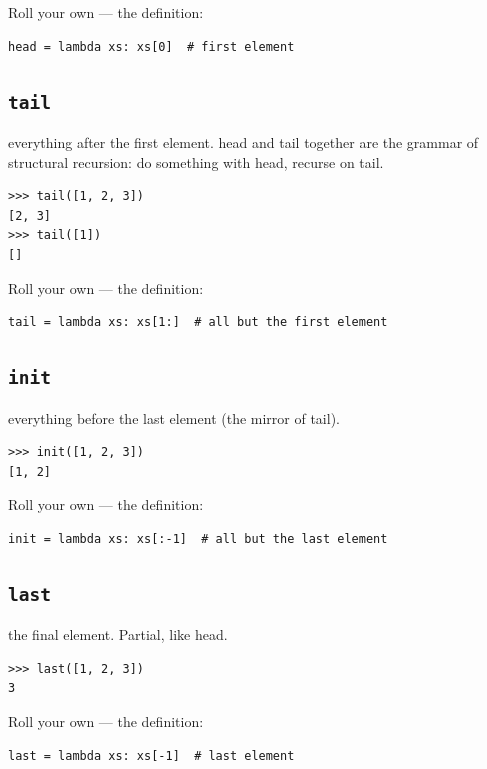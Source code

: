 \documentclass[10pt,letterpaper]{book}
\begin{document}
Roll your own --- the definition:

\begin{lstlisting}[style=ex]
head = lambda xs: xs[0]  # first element
\end{lstlisting}

\subsection{\texttt{tail}}\label{def:tail}
everything after the first element. head and tail together are the grammar of structural recursion: do something with head, recurse on tail.
\begin{lstlisting}[style=ex]
>>> tail([1, 2, 3])
[2, 3]
>>> tail([1])
[]
\end{lstlisting}

Roll your own --- the definition:

\begin{lstlisting}[style=ex]
tail = lambda xs: xs[1:]  # all but the first element
\end{lstlisting}
\subsection{\texttt{init}}\label{def:init}
everything before the last element (the mirror of tail).
\begin{lstlisting}[style=ex]
>>> init([1, 2, 3])
[1, 2]
\end{lstlisting}

Roll your own --- the definition:

\begin{lstlisting}[style=ex]
init = lambda xs: xs[:-1]  # all but the last element
\end{lstlisting}

\subsection{\texttt{last}}\label{def:last}
the final element. Partial, like head.
\begin{lstlisting}[style=ex]
>>> last([1, 2, 3])
3
\end{lstlisting}

Roll your own --- the definition:

\begin{lstlisting}[style=ex]
last = lambda xs: xs[-1]  # last element
\end{lstlisting}
\end{document}
